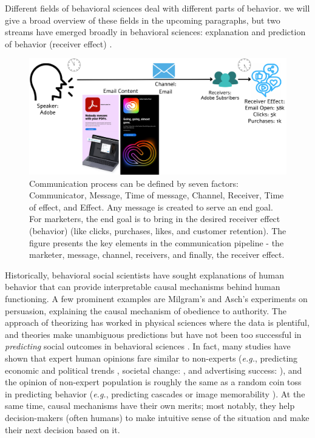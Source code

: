 Different fields of behavioral sciences deal with different parts of behavior. we will give a broad overview of these fields in the upcoming paragraphs, but two streams have emerged broadly in behavioral sciences: explanation and prediction of behavior (receiver effect) \cite{breiman2001statistical,hofman2017prediction,shmueli2010explain}. 


\begin{figure}[!t]
  \centering
  \includegraphics[width=1.0\textwidth]{images/factors of communication.pdf}
  \caption{Communication process can be defined by seven factors: Communicator, Message, Time of message, Channel, Receiver, Time of effect, and Effect. Any message is created to serve an end goal. For marketers, the end goal is to bring in the desired receiver effect (behavior) (like clicks, purchases, likes, and customer retention). The figure presents the key elements in the communication pipeline - the marketer, message, channel, receivers, and finally, the receiver effect.   \label{fig:factors-of-communication}}
\end{figure}

Historically, behavioral social scientists have sought explanations of human behavior that can provide interpretable causal mechanisms behind human functioning. A few prominent examples are Milgram's \cite{milgram1978obedience} and Asch's \cite{asch1948doctrine} experiments on persuasion, explaining the causal mechanism of obedience to authority. The approach of theorizing has worked in physical sciences where the data is plentiful, and theories make unambiguous predictions but have not been too successful in \textit{predicting} social outcomes in behavioral sciences \cite{open2015estimating,tetlock2017expert,forecasting2023insights}. In fact, many studies have shown that expert human opinions fare similar to non-experts (\textit{e.g.}, predicting economic and political trends \cite{tetlock2017expert}, societal change: \cite{forecasting2023insights}, and advertising success: \cite{singh2024measuring}), and the opinion of non-expert population is roughly the same as a random coin toss in predicting behavior (\textit{e.g.}, predicting cascades \cite{tan2014effect} or image memorability \cite{isola2013makes}). At the same time, causal mechanisms have their own merits; most notably, they help decision-makers (often humans) to make intuitive sense of the situation and make their next decision based on it. 


